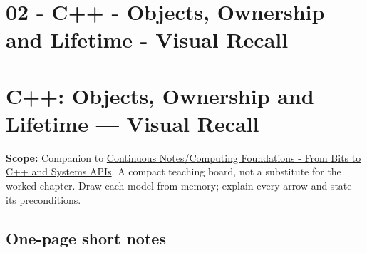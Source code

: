 \hypertarget{appendix-960160274237}{}
\section*{02 - C++ - Objects, Ownership and Lifetime - Visual Recall}
\section{C++: Objects, Ownership and Lifetime --- Visual Recall}\label{appendix-960160274237-c-objects-ownership-and-lifetime-visual-recall}

\textbf{Scope:} Companion to \href{Continuous\%20Notes/Computing\%20Foundations\%20-\%20From\%20Bits\%20to\%20C++\%20and\%20Systems\%20APIs}{Continuous Notes/Computing Foundations - From Bits to C++ and Systems APIs}. A compact teaching board, not a substitute for the worked chapter. Draw each model from memory; explain every arrow and state its preconditions.

\subsection{One-page short notes}\label{appendix-960160274237-one-page-short-notes}

